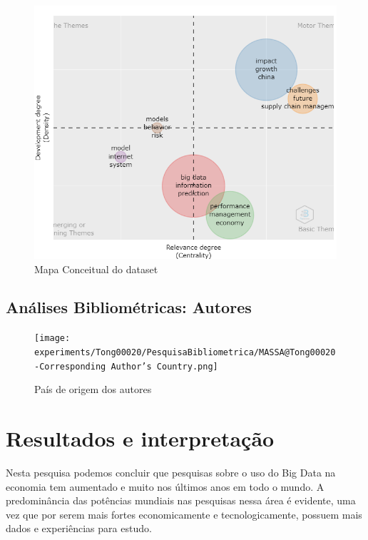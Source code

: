 \begin{figure}[ht]
    \centering
    \includegraphics[width=12cm]{experiments/Tong00020/PesquisaBibliometrica/Conceptual Structure/MASSA@Tong00020-Thematic Map.png}
    \caption{Mapa Conceitual do dataset}
    \label{fig:map-tres}
\end{figure}

\subsection{Análises Bibliométricas: Autores}

\begin{figure}[ht]
    \centering
    \texttt{[image: experiments/Tong00020/PesquisaBibliometrica/MASSA@Tong00020-Corresponding Author's Country.png]}
    \caption{País de origem dos autores}
    \label{fig:map-autor}
\end{figure}


\section{Resultados e interpretação}
Nesta pesquisa podemos concluir que pesquisas sobre o uso do Big Data na economia tem aumentado e muito nos últimos anos em todo o mundo. A predominância das potências mundiais nas pesquisas nessa área é evidente, uma vez que por serem mais fortes economicamente e tecnologicamente, possuem mais dados e experiências para estudo.